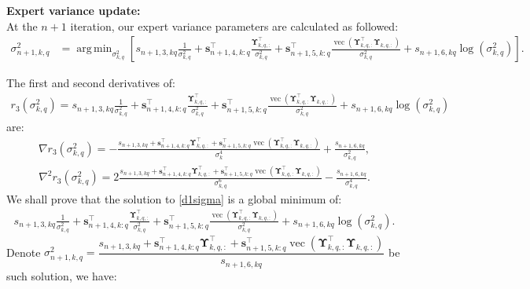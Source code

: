 \documentclass{article}
\DeclareMathOperator*{\vect}{vec} %
\newcommand{\nn}{\nonumber} %
\def\vs{{\bm{s}}}
\def\mUpsilon{{\bm{\Upsilon}}}
\DeclareMathOperator*{\argmin}{arg\,min}
\begin{document}
\textbf{Expert variance update:}\\
At the $n+1$ iteration, our expert variance parameters are calculated as followed:
\begin{align*}
    \sigma_{n+1,k,q}^{2}&=\displaystyle\argmin_{\sigma_{k,q}^2}\left[s_{n+1,3,kq}\frac{1}{\sigma_{k,q}^2}+\vs_{n+1,4,k:q}^{\top}\frac{\mUpsilon_{k,q,:}^{\top}}{\sigma_{k,q}^2}+\vs_{n+1,5,k:q}^{\top}\frac{\vect(\mUpsilon_{k,q,:}^{\top}\mUpsilon_{k,q,:})}{\sigma_{k,q}^2}+s_{n+1,6,kq}\log(\sigma_{k,q}^2)\right].
\end{align*}
\par The first and second derivatives of: 
\begin{align*}
    r_3(\sigma_{k,q}^2)=s_{n+1,3,kq}\frac{1}{\sigma_{k,q}^2}+\vs_{n+1,4,k:q}^{\top}\frac{\mUpsilon_{k,q,:}^{\top}}{\sigma_{k,q}^2}+\vs_{n+1,5,k:q}^{\top}\frac{\vect(\mUpsilon_{k,q,:}^{\top}\mUpsilon_{k,q,:})}{\sigma_{k,q}^2}+s_{n+1,6,kq}\log(\sigma_{k,q}^2)
\end{align*} are:
\begin{align} \label{d1sigma}
    \nabla r_3(\sigma_{k,q}^2)=-\frac{s_{n+1,3,kq}+\vs_{n+1,4,k:q}^{\top}\mUpsilon_{k,q,:}^{\top}+\vs_{n+1,5,k:q}^{\top}\vect(\mUpsilon_{k,q,:}^{\top}\mUpsilon_{k,q,:})}{\sigma_k^4}+\frac{s_{n+1,6,kq}}{\sigma_{k,q}^2},
\end{align}
\begin{align} 
    \nabla^2 r_3(\sigma_{k,q}^2)=2\frac{s_{n+1,3,kq}+\vs_{n+1,4,k:q}^{\top}\mUpsilon_{k,q,:}^{\top}+\vs_{n+1,5,k:q}^{\top}\vect(\mUpsilon_{k,q,:}^{\top}\mUpsilon_{k,q,:})}{\sigma_{k,q}^6}-\frac{s_{n+1,6,kq}}{\sigma_{k,q}^4}.\nn
\end{align}
We shall prove that the solution to \cref{d1sigma} is a global minimum of: 
\begin{align*}
    s_{n+1,3,kq}\frac{1}{\sigma_{k,q}^2}+\vs_{n+1,4,k:q}^{\top}\frac{\mUpsilon_{k,q,:}^{\top}}{\sigma_{k,q}^2}+\vs_{n+1,5,k:q}^{\top}\frac{\vect(\mUpsilon_{k,q,:}^{\top}\mUpsilon_{k,q,:})}{\sigma_{k,q}^2}+s_{n+1,6,kq}\log(\sigma_{k,q}^2).
\end{align*}
Denote $\sigma_{n+1,k,q}^{2}=\dfrac{s_{n+1,3,kq}+\vs_{n+1,4,k:q}^{\top}\mUpsilon_{k,q,:}^{\top}+\vs_{n+1,5,k:q}^{\top}\vect(\mUpsilon_{k,q,:}^{\top}\mUpsilon_{k,q,:})}{s_{n+1,6,kq}}$ be such solution, we have:
\end{document}

